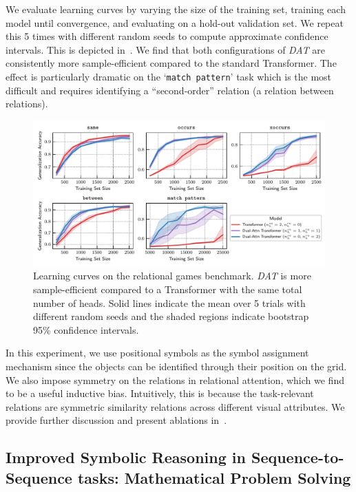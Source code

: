 We evaluate learning curves by varying the size of the training set, training each model until convergence, and evaluating on a hold-out validation set. We repeat this 5 times with different random seeds to compute approximate confidence intervals. This is depicted in~. We find that both configurations of \textit{DAT} are consistently more sample-efficient compared to the standard Transformer. The effect is particularly dramatic on the `\texttt{match pattern}' task which is the most difficult and requires identifying a ``second-order'' relation (a relation between relations).

\begin{figure}
    \includegraphics[width=\textwidth]{figs/experiments/relgames/relgames_learning_curves.pdf}
    \caption{Learning curves on the relational games benchmark. \textit{DAT} is more sample-efficient compared to a Transformer with the same total number of heads. Solid lines indicate the mean over 5 trials with different random seeds and the shaded regions indicate bootstrap 95\% confidence intervals.}\label{fig:relgames_learning_curves}
\end{figure}

In this experiment, we use positional symbols as the symbol assignment mechanism since the objects can be identified through their position on the grid. We also impose symmetry on the relations in relational attention, which we find to be a useful inductive bias. Intuitively, this is because the task-relevant relations are symmetric similarity relations across different visual attributes. We provide further discussion and present ablations in~.

\subsection{Improved Symbolic Reasoning in Sequence-to-Sequence tasks: Mathematical Problem Solving}\label{ssec:math}

